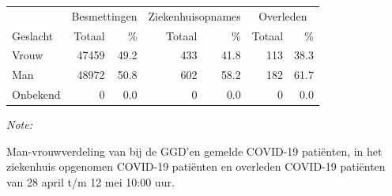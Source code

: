 \documentclass[
  english,
  man,floatsintext]{apa6}
\begin{document}
\begin{table}
\centering\begingroup\fontsize{11}{13}\selectfont

\begin{threeparttable}
\begin{tabular}{lrrrrrr}
\toprule
\multicolumn{1}{c}{ } & \multicolumn{2}{c}{Besmettingen} & \multicolumn{2}{c}{Ziekenhuisopnames} & \multicolumn{2}{c}{Overleden} \\
\cmidrule(l{3pt}r{3pt}){2-3} \cmidrule(l{3pt}r{3pt}){4-5} \cmidrule(l{3pt}r{3pt}){6-7}
Geslacht & Totaal & \% & Totaal & \% & Totaal & \%\\
\midrule
Vrouw & 47459 & 49.2 & 433 & 41.8 & 113 & 38.3\\
Man & 48972 & 50.8 & 602 & 58.2 & 182 & 61.7\\
Onbekend & 0 & 0.0 & 0 & 0.0 & 0 & 0.0\\
\bottomrule
\end{tabular}
\begin{tablenotes}
\item \textit{Note: } 
\item Man-vrouwverdeling van bij de GGD’en gemelde COVID-19 patiënten, in het ziekenhuis opgenomen COVID-19 patiënten en overleden COVID-19 patiënten van 28 april t/m 12 mei 10:00 uur.
\end{tablenotes}
\end{threeparttable}
\endgroup{}
\end{table}
\newpage
\end{document}
